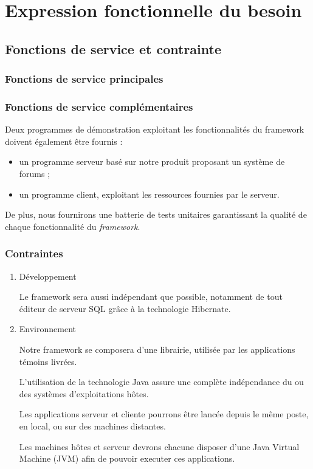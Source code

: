 \section{Expression fonctionnelle du besoin}

\subsection{Fonctions de service et contrainte}
\subsubsection{Fonctions de service principales}

\subsubsection{Fonctions de service complémentaires}

Deux programmes de démonstration exploitant les fonctionnalités du framework doivent également être fournis :

\begin{itemize}
 \item un programme serveur basé sur notre produit proposant un système de forums ;
 \item un programme client, exploitant les ressources fournies par le serveur.
\end{itemize}

De plus, nous fournirons une batterie de tests unitaires garantissant la qualité de chaque fonctionnalité du \emph{framework}.

\subsubsection{Contraintes}
\begin{enumerate}
 \item Développement

Le framework sera aussi indépendant que possible, notamment de tout éditeur de serveur SQL grâce à la technologie Hibernate.

 \item Environnement

Notre framework se composera d'une librairie, utilisée par les applications témoins livrées.

L'utilisation de la technologie Java assure une complète indépendance du ou des systèmes d'exploitations hôtes.

Les applications serveur et cliente pourrons être lancée depuis le même poste, en local, ou sur des machines distantes.

Les machines hôtes et serveur devrons chacune disposer d'une Java Virtual Machine (JVM) afin de pouvoir executer ces applications.

\end{enumerate}

